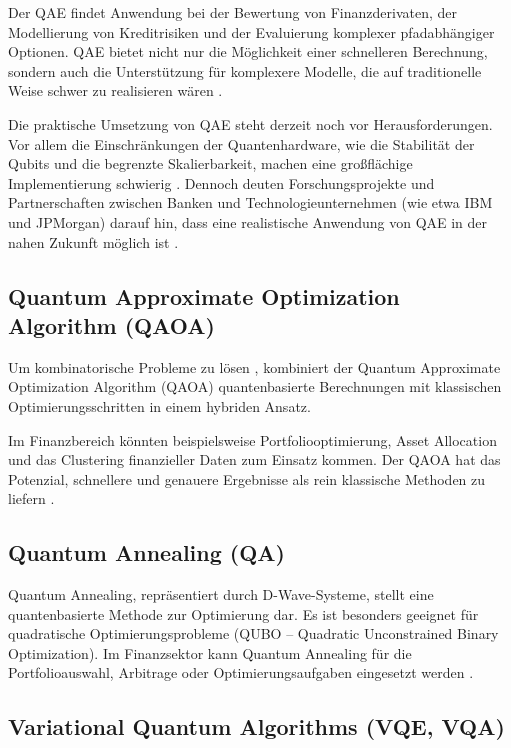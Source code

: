 Der QAE findet Anwendung bei der Bewertung von Finanzderivaten, der Modellierung von Kreditrisiken und der Evaluierung komplexer pfadabhängiger Optionen. QAE bietet nicht nur die Möglichkeit einer schnelleren Berechnung, sondern auch die Unterstützung für komplexere Modelle, die auf traditionelle Weise schwer zu realisieren wären \cite{orus2018,egger2020,rebentrost2018}.

Die praktische Umsetzung von QAE steht derzeit noch vor Herausforderungen. Vor allem die Einschränkungen der Quantenhardware, wie die Stabilität der Qubits und die begrenzte Skalierbarkeit, machen eine großflächige Implementierung schwierig \cite{bouland2020,martin2022}. Dennoch deuten Forschungsprojekte und Partnerschaften zwischen Banken und Technologieunternehmen (wie etwa IBM und JPMorgan) darauf hin, dass eine realistische Anwendung von QAE in der nahen Zukunft möglich ist \cite{egger2020}.

\subsection{Quantum Approximate Optimization Algorithm (QAOA)}

Um kombinatorische Probleme zu lösen \cite{orus2019,bouland2020}, kombiniert der Quantum Approximate Optimization Algorithm (QAOA) quantenbasierte Berechnungen mit klassischen Optimierungsschritten in einem hybriden Ansatz.

Im Finanzbereich könnten beispielsweise Portfoliooptimierung, Asset Allocation und das Clustering finanzieller Daten zum Einsatz kommen. Der QAOA hat das Potenzial, schnellere und genauere Ergebnisse als rein klassische Methoden zu liefern \cite{orus2019}.

\subsection{Quantum Annealing (QA)}

Quantum Annealing, repräsentiert durch D-Wave-Systeme, stellt eine quantenbasierte Methode zur Optimierung dar. Es ist besonders geeignet für quadratische Optimierungsprobleme (QUBO – Quadratic Unconstrained Binary Optimization). Im Finanzsektor kann Quantum Annealing für die Portfolioauswahl, Arbitrage oder Optimierungsaufgaben eingesetzt werden \cite{orus2019,bouland2020}.

\subsection{Variational Quantum Algorithms (VQE, VQA)}

